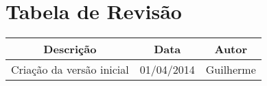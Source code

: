 

\chapter*{Tabela de Revisão}

	\begin{center}
	
	  \begin{tabular}{ c| c | c }
	  
		Descrição & Data & Autor \\ \hline
		Criação da versão inicial & 01/04/2014 & Guilherme \\ %
		
	  \end{tabular}
	
	\end{center}

